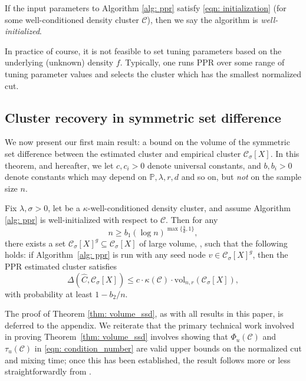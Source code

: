 \documentclass[11pt,twoside]{article}
\newcommand{\vol}{\mathrm{vol}}
\newcommand{\1}{\mathbbm{1}}
\newcommand{\Phibf}{\Phi_{u}}
\newcommand{\taubf}{\tau_{u}}
\newcommand{\Xbf}{X}
\newcommand{\Pbb}{\mathbb{P}}
\newcommand{\Cbb}{\mathbb{C}}
\newcommand{\Cset}{\mathcal{C}}
\newcommand{\Csig}{\Cset_{\sigma}}
\newcommand{\Cest}{\widehat{C}}
\begin{document}
\begin{definition}
If the input parameters to Algorithm \ref{alg: ppr} satisfy \eqref{eqn:
  initialization} (for some well-conditioned density cluster $\Cset$), then we  
say the algorithm is \emph{well-initialized}. 
\end{definition}

In practice of course, it is not feasible to set tuning parameters based on the 
underlying (unknown) density $f$. Typically, one runs PPR over some range of
tuning parameter values and selects the cluster which has the smallest
normalized cut.     

\subsection{Cluster recovery in symmetric set difference}

We now present our first main result: a bound on the volume of the symmetric set
difference between the estimated cluster \smash{$\Cest$} and empirical cluster 
$\Csig[\Xbf]$. In this theorem, and hereafter, we let $c, c_i > 0$ denote
universal constants, and $b,b_i > 0$ denote constants which may depend on  
$\Pbb,\lambda,r,d$ and so on, but \emph{not} on the sample size 
$n$.  %

\begin{theorem}
  \label{thm: volume_ssd}
  Fix $\lambda,\sigma > 0$, let \smash{$\Cset \in \Cbb_f(\lambda)$} be a   
  $\kappa$-well-conditioned density cluster, and assume Algorithm \ref{alg: ppr}
  is well-initialized with respect to $\Cset$. Then for any 
  $$
  n \geq b_1 (\log n)^{\max\{\frac{3}{d},1\}},
  $$
  there exists a set $\Csig[\Xbf]^g 
  \subseteq \Csig[\Xbf]$ of large volume, \smash{$\vol_{n,r}(\Csig[\Xbf]^g)
    \geq \vol_{n,r}(\Csig[\Xbf])/2$}, such that the following holds: if 
  Algorithm~\ref{alg: ppr} is run with any seed node $v \in \Csig[\Xbf]^g$, then
  the PPR estimated cluster \smash{$\Cest$} satisfies
  \begin{equation}
    \label{eqn: volume_ssd}
    \Delta(\Cest, \Csig[\Xbf]) \leq c \cdot \kappa(\Cset) \cdot
    \vol_{n,r}(\Csig[\Xbf]),  
  \end{equation}
  with probability at least $1 - b_2/n$. 
\end{theorem}

The proof of Theorem \ref{thm: volume_ssd}, as with all results in this paper,
is deferred to the appendix.  We reiterate that the primary technical 
work involved in proving Theorem~\ref{thm: volume_ssd} involves showing that
$\Phibf(\Cset)$ and $\taubf(\Cset)$ in \eqref{eqn: condition_number} are
valid upper bounds on the normalized cut and mixing time; once this has been 
established, the result follows more or less straightforwardly
from \citet{zhu2013}.  
\end{document}
